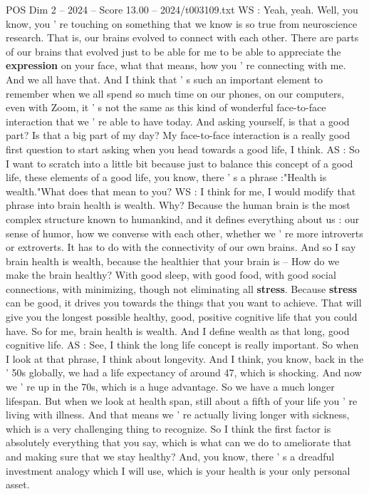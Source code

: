 \begin{textsample}{POS Dim 2 – 2024 – Score 13.00 – 2024/t003109.txt}
WS : Yeah, yeah.
Well, you know, you ' re touching on something that we know is so true from neuroscience research.
That is, our brains evolved to connect with each other.
There are parts of our brains that evolved just to be able for me to be able to appreciate the \textbf{expression} on your face, what that means, how you ' re connecting with me.
And we all have that.
And I think that ' s such an important element to remember when we all spend so much time on our phones, on our computers, even with Zoom, it ' s not the same as this kind of wonderful face-to-face interaction that we ' re able to have today.
And asking yourself, is that a good part?
Is that a big part of my day?
My face-to-face interaction is a really good first question to start asking when you head towards a good life, I think.
AS : So I want to scratch into a little bit because just to balance this concept of a good life, these elements of a good life, you know, there ' s a phrase :"Health is wealth."What does that mean to you?
WS : I think for me, I would modify that phrase into brain health is wealth.
Why?
Because the human brain is the most complex structure known to humankind, and it defines everything about us : our sense of humor, how we converse with each other, whether we ' re more introverts or extroverts.
It has to do with the connectivity of our own brains.
And so I say brain health is wealth, because the healthier that your brain is -- How do we make the brain healthy?
With good sleep, with good food, with good social connections, with minimizing, though not eliminating all \textbf{stress}.
Because \textbf{stress} can be good, it drives you towards the things that you want to achieve.
That will give you the longest possible healthy, good, positive cognitive life that you could have.
So for me, brain health is wealth.
And I define wealth as that long, good cognitive life.
AS : See, I think the long life concept is really important.
So when I look at that phrase, I think about longevity.
And I think, you know, back in the ' 50s globally, we had a life expectancy of around 47, which is shocking.
And now we ' re up in the 70s, which is a huge advantage.
So we have a much longer lifespan.
But when we look at health span, still about a fifth of your life you ' re living with illness.
And that means we ' re actually living longer with sickness, which is a very challenging thing to recognize.
So I think the first factor is absolutely everything that you say, which is what can we do to ameliorate that and making sure that we stay healthy?
And, you know, there ' s a dreadful investment analogy which I will use, which is your health is your only personal asset.

\end{textsample}
